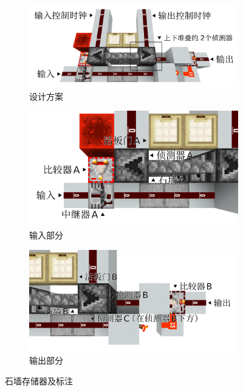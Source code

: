 \documentclass{article}
\begin{document}
    \begin{figure}[t]
        \centering
        \begin{subfigure}{0.7\linewidth}
            \includegraphics[width=\linewidth]{figures/wall-based-storage-1.png}
            \caption{设计方案}
            \label{fig:wall-based-storage}
        \end{subfigure}
        \hspace*{-0.5cm}
        \begin{subfigure}{0.45\linewidth}
            \includegraphics[width=\linewidth]{figures/wall-based-storage-2.png}
            \caption{输入部分}
            \label{fig:wall-based-storage-input}
        \end{subfigure}
        \hspace*{0.5cm}
        \begin{subfigure}{0.45\linewidth}
            \includegraphics[width=\linewidth]{figures/wall-based-storage-3.png}
            \caption{输出部分}
            \label{fig:wall-based-storage-output}
        \end{subfigure}
        \caption{石墙存储器及标注}
    \end{figure}
\end{document}
